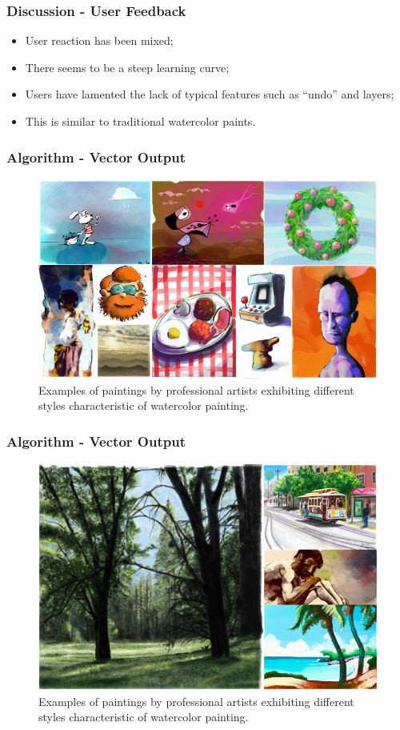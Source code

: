 \documentclass{beamer}
\begin{document}
\begin{frame}
    \frametitle{Discussion - User Feedback}
    \begin{itemize}
        \item User reaction has been mixed;
        \item There seems to be a steep learning curve;
        \item Users have lamented the lack of typical features such as ``undo''
        and layers;
        \item This is similar to traditional watercolor paints.
    \end{itemize}
\end{frame}

\begin{frame}
    \frametitle{Algorithm - Vector Output}
    \begin{figure}
        \centering
        \includegraphics[width=0.8\paperwidth]{f6-1.png}
        \caption{\footnotesize{Examples of paintings by professional artists
        exhibiting different styles characteristic of watercolor painting.}}
    \end{figure}
\end{frame}

\begin{frame}
    \frametitle{Algorithm - Vector Output}
    \begin{figure}
        \centering
        \includegraphics[width=0.8\paperwidth]{f6-2.png}
        \caption{\footnotesize{Examples of paintings by professional artists
        exhibiting different styles characteristic of watercolor painting.}}
    \end{figure}
\end{frame}
\end{document}
